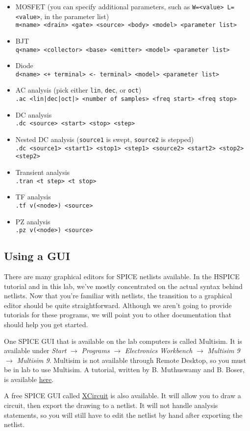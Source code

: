 \documentclass{article}
\begin{document}
\begin{itemize}
	\item MOSFET (you can specify additional parameters, such as \verb|W=<value> L=<value>|, in the parameter list) \\ \verb|m<name> <drain> <gate> <source> <body> <model> <parameter list>|
	\item BJT \\ \verb|q<name> <collector> <base> <emitter> <model> <parameter list>|
	\item Diode \\ \verb|d<name> <+ terminal> <- terminal> <model> <parameter list>|
	\item AC analysis (pick either \verb|lin|, \verb|dec|, or \verb|oct|) \\ \verb/.ac <lin|dec|oct|> <number of samples> <freq start> <freq stop>/
	\item DC analysis \\ \verb|.dc <source> <start> <stop> <step>|
	\item Nested DC analysis (\verb|source1| is swept, \verb|source2| is stepped) \\ \verb|.dc <source1> <start1> <stop1> <step1> <source2> <start2> <stop2> <step2>|
	\item Transient analysis \\ \verb|.tran <t step> <t stop>|
	\item TF analysis \\ \verb|.tf v(<node>) <source>|
	\item PZ analysis \\ \verb|.pz v(<node>) <source>|
\end{itemize}

\subsection{Using a GUI}

There are many graphical editors for SPICE netlists available. In the HSPICE tutorial and in this lab, we've mostly concentrated on the actual syntax behind netlists. Now that you're familiar with netlists, the transition to a graphical editor should be quite straightforward. Although we aren't going to provide tutorials for these programs, we will point you to other documentation that should help you get started.

One SPICE GUI that is available on the lab computers is called Multisim. It is available under \textit{Start} $\rightarrow$ \textit{Programs} $\rightarrow$ \textit{Electronics Workbench} $\rightarrow$ \textit{Multisim 9} $\rightarrow$ \textit{Multisim 9}. Multisim is not available through Remote Desktop, so you must be in lab to use Multisim. A tutorial, written by B. Muthuswamy and B. Boser, is available \href{http://nonlinear.eecs.berkeley.edu/bharath/temp/EE100-MultiSim-Tutorial-2.00.doc}{here}.

A free SPICE GUI called \href{http://opencircuitdesign.com/xcircuit/}{XCircuit} is also available. It will allow you to draw a circuit, then export the drawing to a netlist. It will not handle analysis statements, so you will still have to edit the netlist by hand after exporting the netlist.
\end{document}
